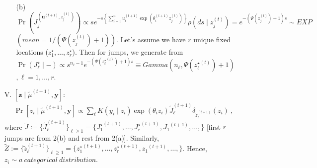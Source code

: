 \documentclass[10pt, oneside]{article}   	%
\renewcommand{\th}{\theta}
\newcommand{\ub}{\mathbf{u}}
\begin{document}
\begin{itemize}
\begin{itemize}
 \item[(b)] $\Pr\left(J^{\left({\ub}^{(t+1)}, z^{(t)}_j\right)}_j\right) \propto s e^{-s \left\{\sum_{i=1}^n u^{(t+1)}_i \exp(\th^{(t+1)}_i z^{(t)}_j)\right\}} \rho(ds \mid z^{(t)}_j) =  e^{- \left(\Psi\left(z^{(t)}_j\right) +1\right) s} \sim EXP$ $\left(mean = 1\bigg/\left(\Psi\left(z^{(t)}_j\right) +1\right)\right)$. Let's assume we have $r$ unique fixed locations ($z^\star_1, \dots, z^\star_r$). Then for jumps, we generate from $\Pr(J^\star_\ell \mid -)\propto s^{n_\ell - 1}  e^{- \left(\Psi\left({z^\star_\ell}^{(t)}\right) +1\right) s} \equiv Gamma\left(n_\ell,  \Psi\left({z^\star_\ell}^{(t)}\right) +1\right)$ $, \ell = 1, \dots, r$.
\end{itemize}
\item[V.] $[\mathbf{z} \mid {\widetilde \mu}^{(t+1)}, \mathbf{y}]:$ 
\begin{eqnarray*}
\Pr[z_i \mid {\widetilde \mu}^{(t+1)}, \mathbf{y}] \propto \sum_{\ell} K(y_i \mid z_i) \exp(\theta_i z_i) {\widetilde{J}}^{(t+1)}_\ell \delta_{{\widetilde z}^{(t+1)}_\ell}(z_i)\ ,
\end{eqnarray*} 
where $\widetilde J := \{{\widetilde{J}}^{(t+1)}_\ell \}_{\ell \geq 1} = \{{J^\star_1}^{(t+1)}, \dots,  {J^\star_r}^{(t+1)}, {J_1}^{(t+1)}, \dots, \}$ [first $r$ jumps are from 2(b) and rest from 2(a)]. Similarly, $\widetilde Z := \{{\widetilde z}^{(t+1)}_\ell\}_{\ell \geq 1} = \{{z^\star_1}^{(t+1)}, \dots,  {z^\star_r}^{(t+1)}, {z_1}^{(t+1)}, \dots, \}$. Hence, $z_i \sim a \ categorical \ distribution$. 
\end{itemize}
\end{document}

